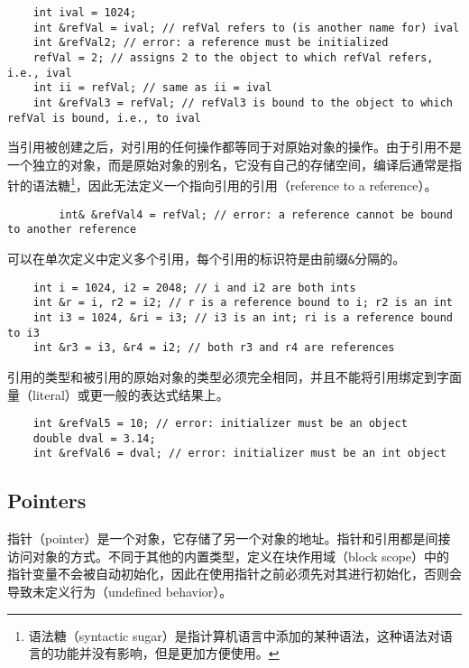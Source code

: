 \begin{verbatim}
    int ival = 1024;
    int &refVal = ival; // refVal refers to (is another name for) ival
    int &refVal2; // error: a reference must be initialized
    refVal = 2; // assigns 2 to the object to which refVal refers, i.e., ival
    int ii = refVal; // same as ii = ival
    int &refVal3 = refVal; // refVal3 is bound to the object to which refVal is bound, i.e., to ival
\end{verbatim}

当引用被创建之后，对引用的任何操作都等同于对原始对象的操作。由于引用不是一个独立的对象，而是原始对象的别名，它没有自己的存储空间，编译后通常是指针的语法糖\footnote{语法糖（syntactic sugar）是指计算机语言中添加的某种语法，这种语法对语言的功能并没有影响，但是更加方便使用。}，因此无法定义一个指向引用的引用（reference to a reference）。

\begin{verbatim}
        int& &refVal4 = refVal; // error: a reference cannot be bound to another reference
\end{verbatim}

可以在单次定义中定义多个引用，每个引用的标识符是由前缀\texttt{&}分隔的。

\begin{verbatim}
    int i = 1024, i2 = 2048; // i and i2 are both ints
    int &r = i, r2 = i2; // r is a reference bound to i; r2 is an int
    int i3 = 1024, &ri = i3; // i3 is an int; ri is a reference bound to i3
    int &r3 = i3, &r4 = i2; // both r3 and r4 are references
\end{verbatim}

引用的类型和被引用的原始对象的类型必须完全相同，并且不能将引用绑定到字面量（literal）或更一般的表达式结果上。

\begin{verbatim}
    int &refVal5 = 10; // error: initializer must be an object
    double dval = 3.14;
    int &refVal6 = dval; // error: initializer must be an int object
\end{verbatim}

\subsection{Pointers}
指针（pointer）是一个对象，它存储了另一个对象的地址。指针和引用都是间接访问对象的方式。不同于其他的内置类型，定义在块作用域（block scope）中的指针变量不会被自动初始化，因此在使用指针之前必须先对其进行初始化，否则会导致未定义行为（undefined behavior）。


